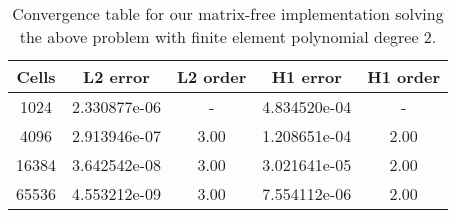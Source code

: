 
\begin{table}[h]
    \centering
    \begin{tabular}{|c|c|c|c|c|}
        \hline
        Cells & L2 error & L2 order & H1 error & H1 order \\
        \hline
        1024 & 2.330877e-06 & -  & 4.834520e-04 & - \\
        4096 & 2.913946e-07 & 3.00 & 1.208651e-04 & 2.00 \\
        16384 & 3.642542e-08 & 3.00 & 3.021641e-05 & 2.00 \\
        65536 & 4.553212e-09 & 3.00 & 7.554112e-06 & 2.00 \\
        \hline
    \end{tabular}
    \caption{Convergence table for our matrix-free implementation solving the above problem with finite element polynomial degree 2.}
    \label{tab:conv_mf}
\end{table}